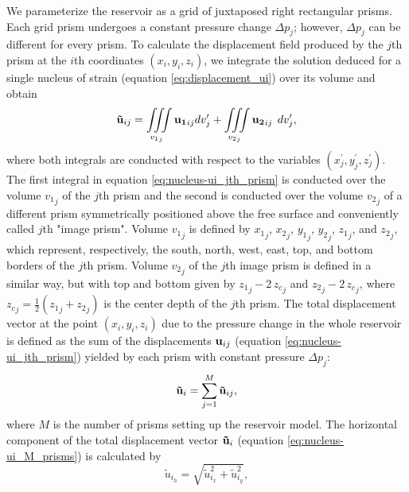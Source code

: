 \documentclass[P]{BrJG_submit}
\begin{document}
We parameterize the reservoir as a grid of juxtaposed right rectangular prisms.
Each grid prism undergoes a constant pressure change $\Delta p_{j}$; however, $\Delta p_{j}$
can be different for every prism. 
To calculate the displacement field produced by the $j$th prism
at the $i$th coordinates  $(x_i, y_i, z_i)$, we integrate the solution deduced for a single nucleus of strain (equation \ref{eq:displacement_ui})
over its volume and obtain
\begin{equation}
{\bf{\tilde{u}}}_{ij} = 
\iiint\limits_{{v_{1}}_{j}}
{\bf{u_{1}}}_{ij} dv_{j}^{\prime}
 + 
\iiint\limits_{{v_{2}}_{j}}
{\bf{u_{2}}}_{ij} \:\:  dv_{j}^{\prime},
\label{eq:nucleus-ui_jth_prism}
\end{equation}
where both integrals are conducted with respect to the variables 
$(x^{\prime}_{j}, y^{\prime}_{j}, z^{\prime}_{j})$. The first integral in equation 
\ref{eq:nucleus-ui_jth_prism} is conducted over the volume ${v_{1}}_{j}$ of the $j$th
prism and the second is conducted over the volume 
${v_{2}}_{j}$ of a different prism symmetrically positioned above the free surface 
and conveniently called $j$th "image prism".
Volume ${v_{1}}_{j}$ is defined by ${x_1}_{j}$, ${x_2}_{j}$, ${y_1}_{j}$, ${y_2}_{j}$,
${z_1}_{j}$, and ${z_2}_{j}$, which represent, respectively, the south, north, west, 
east, top, and bottom borders of the $j$th prism.
Volume ${v_{2}}_{j}$ of the $j$th image prism is defined in a similar way, but with 
top and bottom given by ${z_1}_{j} - 2 \, {z_c}_{j}$ and ${z_2}_{j} - 2 \, {z_c}_{j}$, where 
${z_c}_{j} = \frac{1}{2}({z_1}_{j} + {z_2}_{j})$ is the center depth of the $j$th prism.
The total displacement vector at the point $(x_i, y_i, z_i)$ due to the
pressure change in the whole reservoir is defined as the sum of the displacements 
${\bf{u}}_{ij}$ (equation \ref{eq:nucleus-ui_jth_prism}) yielded by each prism 
with constant pressure $\Delta p_{j}$:
\begin{equation}
{\bf{\tilde{u}}}_{i} = \sum_{j=1}^{M} {\bf{\tilde{u}}}_{ij},
\label{eq:nucleus-ui_M_prisms}
\end{equation}
where $M$ is the number of prisms setting up the reservoir model.
The horizontal component of the total displacement vector ${\bf{\tilde{u}}}_{i}$ 
(equation \ref{eq:nucleus-ui_M_prisms}) is calculated by 
\begin{equation}
{\tilde{u}}_{{i}_h} = \sqrt{ {\tilde{u}}_{{i}_x}^{2}  +  {\tilde{u}}_{{i}_y}^{2} },
\label{eq:horizontal_displacement}
\end{equation}
\end{document}
